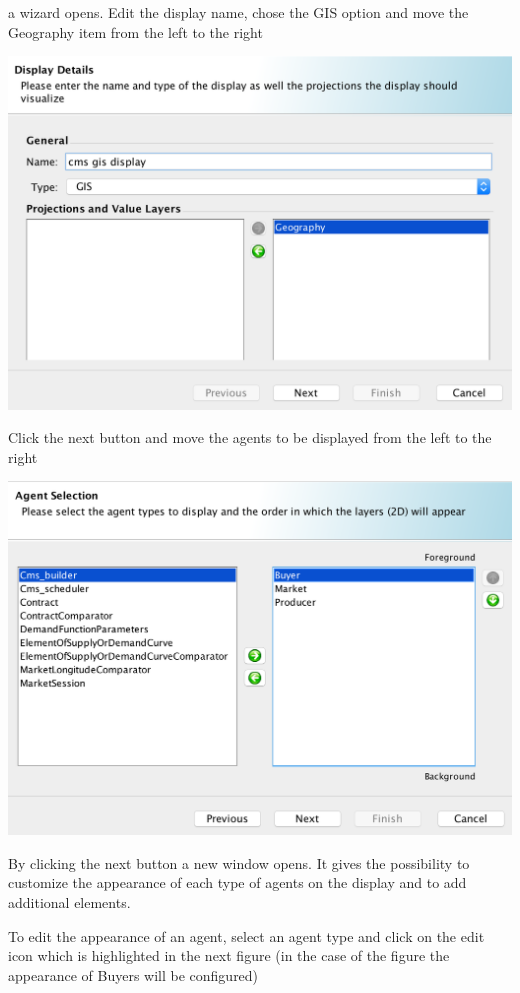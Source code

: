 \documentclass{article}
\begin{document}
\vskip2mm
a wizard opens. Edit the display name, chose the GIS option and move the Geography item from the left to the right

\includegraphics[scale=0.35]{fig_cms_rs_gis2}

Click the next button and move the agents to be displayed from the left to the right

\includegraphics[scale=0.35]{fig_cms_rs_gis3}

By clicking the next button a new window opens. It gives the possibility to customize the appearance of each type of agents on the display and to add additional elements.

To edit the appearance of an agent, select an agent type and click on the edit icon which is highlighted in the next figure (in the case of the figure the appearance of Buyers will be configured)
\end{document}
